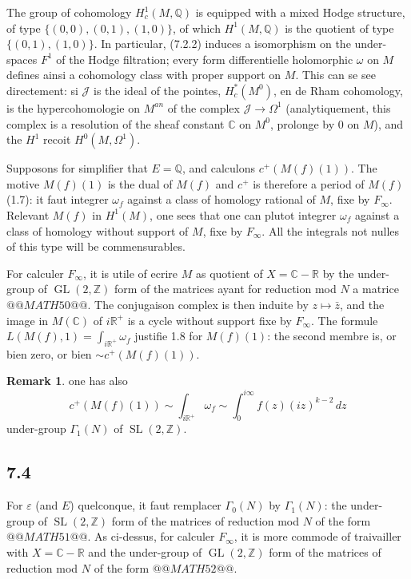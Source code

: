 \documentclass[12pt,a4paper]{article}
\theoremstyle{plain}
\theoremstyle{definition}
\newtheorem{remark}[definition]{Remark}
\theoremstyle{remark}
\DeclareMathOperator{\GL}{GL}
\DeclareMathOperator{\SL}{SL}
\newcommand{\Q}{\mathbb{Q}}
\newcommand{\R}{\mathbb{R}}
\newcommand{\C}{\mathbb{C}}
\newcommand{\Z}{\mathbb{Z}}
\begin{document}
The group of cohomology $H^1_c(M, \Q)$ is equipped with a mixed Hodge structure,
of type $\{(0,0), (0,1), (1,0)\}$, of which $H^1(M, \Q)$ is the quotient of type
$\{(0,1), (1,0)\}$. In particular, (7.2.2) induces a isomorphism on the under-spaces
$F^1$ of the Hodge filtration; every form differentielle holomorphic $\omega$ on $M$ defines
ainsi a cohomology class with proper support on $M$. This can se see
directement: si $\mathcal{J}$ is the ideal of the pointes, $H_c^*(M^0)$, en de Rham cohomology,
is the hypercohomologie on $M^{an}$ of the complex $\mathcal{J} \to \Omega^1$ (analytiquement, this complex
is a resolution of the sheaf constant $\C$ on $M^0$, prolonge by 0 on $M$), and the
$H^1$ recoit $H^0(M, \Omega^1)$.

Supposons for simplifier that $E = \Q$, and calculons $c^+(M(f)(1))$. The motive $M(f)(1)$
is the dual of $M(f)$ and $c^+$ is therefore a period of $M(f)$ (1.7): it faut integrer
$\omega_f$ against a class of homology rational of $M$, fixe by $F_\infty$. Relevant
$M(f)$ in $H^1(M)$, one sees that one can plutot integrer $\omega_f$ against a class
of homology without support of $M$, fixe by $F_\infty$. All the integrals not nulles of
this type will be commensurables.

For calculer $F_\infty$, it is utile of ecrire $M$ as quotient of
$X = \C - \R$ by the under-group of $\GL(2, \Z)$ form of the matrices ayant for
reduction mod $N$ a matrice $@@MATH50@@$. The conjugaison
complex is then induite by $z \mapsto \bar{z}$, and the image in $M(\C)$ of $i\R^+$ is
a cycle without support fixe by $F_\infty$. The formule $L(M(f), 1) = \int_{i\R^+} \omega_f$
justifie 1.8 for $M(f)(1)$: the second membre is, or bien zero, or bien $\sim c^+(M(f)(1))$.

\begin{remark}
one has also
\[
c^+(M(f)(1)) \sim \int_{i\R^+} \omega_f \sim \int_0^{i\infty} f(z) (iz)^{k-2} \, dz
\]
under-group $\Gamma_1(N)$ of $\SL(2, \Z)$.
\end{remark}

\subsection*{7.4}

For $\varepsilon$ (and $E$) quelconque, it faut remplacer $\Gamma_0(N)$ by $\Gamma_1(N)$: the under-group
of $\SL(2, \Z)$ form of the matrices of reduction mod $N$ of the form
$@@MATH51@@$. As ci-dessus, for calculer $F_\infty$, it is more commode of
traivailler with $X = \C - \R$ and the under-group of $\GL(2, \Z)$ form of the matrices
of reduction mod $N$ of the form $@@MATH52@@$.
\end{document}
